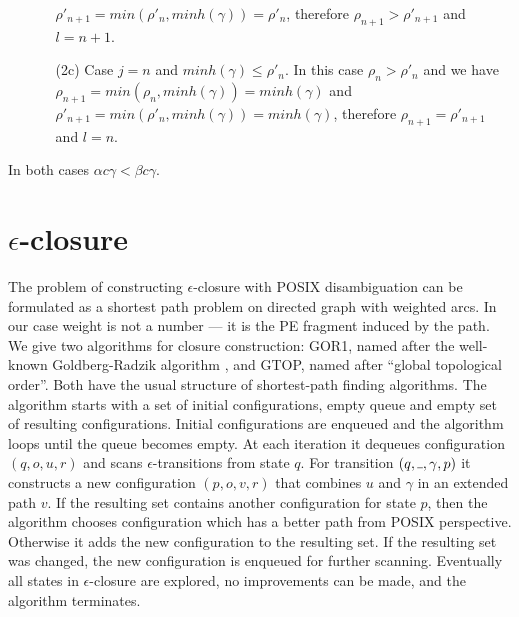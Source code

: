 \documentclass[AMA,STIX1COL]{WileyNJD-v2}
\newcommand{\Xund}{\rule{.4em}{.4pt}}
\begin{document}
\begin{proofEnd}
\begin{itemize}[itemsep=0.5em, topsep=0.5em]
\begin{itemize}
            $\rho'_{n+1} = min(\rho'_n, minh(\gamma)) = \rho'_n$,
            therefore $\rho_{n+1} > \rho'_{n+1}$
            and $l = n + 1$.
        \item[(2c)]
            Case $j = n$ and $minh(\gamma) \leq \rho'_n$.
            In this case $\rho_n > \rho'_n$ and we have
            $\rho_{n+1} = min(\rho_n, minh(\gamma)) = minh(\gamma)$ and
            $\rho'_{n+1} = min(\rho'_n, minh(\gamma)) = minh(\gamma)$,
            therefore $\rho_{n+1} = \rho'_{n+1}$
            and $l = n$.
        \end{itemize}
    \end{itemize}
    In both cases $\alpha c \gamma < \beta c \gamma$.
\end{proofEnd}


\section{$\epsilon$-closure}\label{section_closure}

The problem of constructing $\epsilon$-closure with POSIX disambiguation
can be formulated as a shortest path problem on directed graph with weighted arcs.
In our case weight is not a number --- it is the PE fragment induced by the path.
%
We give two algorithms for closure construction: GOR1, named after the well-known Goldberg-Radzik algorithm \cite{GR93},
and GTOP, named after ``global topological order''.
%
Both have the usual structure of shortest-path finding algorithms.
The algorithm starts with a set of initial configurations, empty queue and empty set of resulting configurations.
Initial configurations are enqueued and the algorithm loops until the queue becomes empty.
At each iteration it dequeues configuration $(q, o, u, r)$ and scans $\epsilon$-transitions from state $q$.
For transition $(q, \Xund, \gamma, p)$ it constructs a new configuration $(p, o, v, r)$
that combines $u$ and $\gamma$ in an extended path $v$.
If the resulting set contains another configuration for state $p$,
then the algorithm chooses configuration which has a better path from POSIX perspective.
Otherwise it adds the new configuration to the resulting set.
If the resulting set was changed, the new configuration is enqueued for further scanning.
Eventually all states in $\epsilon$-closure are explored, no improvements can be made, and the algorithm terminates.
%
\\
\end{document}
